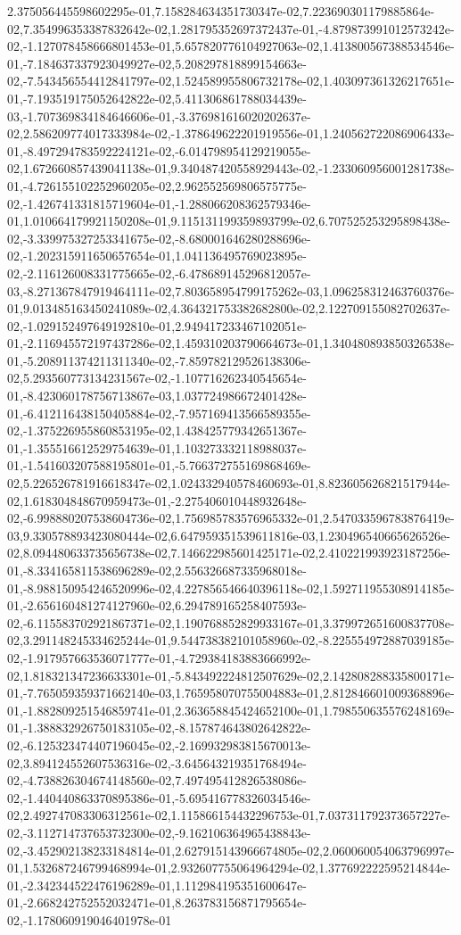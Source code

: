 2.375056445598602295e-01,7.158284634351730347e-02,7.223690301179885864e-02,7.354996353387832642e-02,1.281795352697372437e-01,-4.879873991012573242e-02,-1.127078458666801453e-01,5.657820776104927063e-02,1.413800567388534546e-01,-7.184637337923049927e-02,5.208297818899154663e-02,-7.543456554412841797e-02,1.524589955806732178e-02,1.403097361326217651e-01,-7.193519175052642822e-02,5.411306861788034439e-03,-1.707369834184646606e-01,-3.376981616020202637e-02,2.586209774017333984e-02,-1.378649622201919556e-01,1.240562722086906433e-01,-8.497294783592224121e-02,-6.014798954129219055e-02,1.672660857439041138e-01,9.340487420558929443e-02,-1.233060956001281738e-01,-4.726155102252960205e-02,2.962552569806575775e-02,-1.426741331815719604e-01,-1.288066208362579346e-01,1.010664179921150208e-01,9.115131199359893799e-02,6.707525253295898438e-02,-3.339975327253341675e-02,-8.680001646280288696e-02,-1.202315911650657654e-01,1.041136495769023895e-02,-2.116126008331775665e-02,-6.478689145296812057e-03,-8.271367847919464111e-02,7.803658954799175262e-03,1.096258312463760376e-01,9.013485163450241089e-02,4.364321753382682800e-02,2.122709155082702637e-02,-1.029152497649192810e-01,2.949417233467102051e-01,-2.116945572197437286e-02,1.459310203790664673e-01,1.340480893850326538e-01,-5.208911374211311340e-02,-7.859782129526138306e-02,5.293560773134231567e-02,-1.107716262340545654e-01,-8.423060178756713867e-03,1.037724986672401428e-01,-6.412116438150405884e-02,-7.957169413566589355e-02,-1.375226955860853195e-02,1.438425779342651367e-01,-1.355516612529754639e-01,1.103273332118988037e-01,-1.541603207588195801e-01,-5.766372755169868469e-02,5.226526781916618347e-02,1.024332940578460693e-01,8.823605626821517944e-02,1.618304848670959473e-01,-2.275406010448932648e-02,-6.998880207538604736e-02,1.756985783576965332e-01,2.547033596783876419e-03,9.330578893423080444e-02,6.647959351539611816e-03,1.230496540665626526e-02,8.094480633735656738e-02,7.146622985601425171e-02,2.410221993923187256e-01,-8.334165811538696289e-02,2.556326687335968018e-01,-8.988150954246520996e-02,4.227856546640396118e-02,1.592711955308914185e-01,-2.656160481274127960e-02,6.294789165258407593e-02,-6.115583702921867371e-02,1.190768852829933167e-01,3.379972651600837708e-02,3.291148245334625244e-01,9.544738382101058960e-02,-8.225554972887039185e-02,-1.917957663536071777e-01,-4.729384183883666992e-02,1.818321347236633301e-01,-5.843492224812507629e-02,2.142808288335800171e-01,-7.765059359371662140e-03,1.765958070755004883e-01,2.812846601009368896e-01,-1.882809251546859741e-01,2.363658845424652100e-01,1.798550635576248169e-01,-1.388832926750183105e-02,-8.157874643802642822e-02,-6.125323474407196045e-02,-2.169932983815670013e-02,3.894124552607536316e-02,-3.645643219351768494e-02,-4.738826304674148560e-02,7.497495412826538086e-02,-1.440440863370895386e-01,-5.695416778326034546e-02,2.492747083306312561e-02,1.115866154432296753e-01,7.037311792373657227e-02,-3.112714737653732300e-02,-9.162106364965438843e-02,-3.452902138233184814e-01,2.627915143966674805e-02,2.060060054063796997e-01,1.532687246799468994e-01,2.932607755064964294e-02,1.377692222595214844e-01,-2.342344522476196289e-01,1.112984195351600647e-01,-2.668242752552032471e-01,8.263783156871795654e-02,-1.178060919046401978e-01
